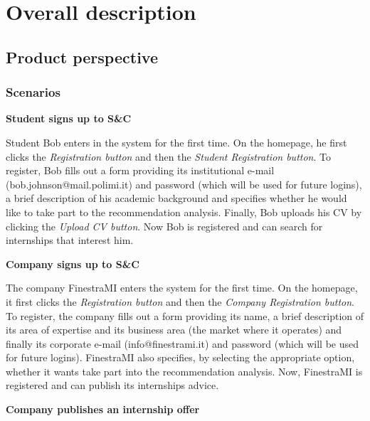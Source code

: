 \chapter{Overall description}
	\section{Product perspective}
		\subsection{Scenarios}
			\textbf{Student signs up to S\&C}
			\begin{flushleft}
				Student Bob enters in the system for the first time. On the homepage, he first clicks the \emph{Registration button} and then the \emph{Student Registration button}. To register, Bob fills out a form providing its institutional e-mail (bob.johnson@mail.polimi.it) and password (which will be used for future logins), a brief description of his academic background and specifies whether he would like to take part to the recommendation analysis. Finally, Bob uploads his CV by clicking the \emph{Upload CV button}. Now Bob is registered and can search for internships that interest him.
			\end{flushleft}
			\textbf{Company signs up to S\&C}
			\begin{flushleft}
				The company FinestraMI enters the system for the first time. On the homepage, it first clicks the \emph{Registration button} and then the \emph{Company Registration button}. To register, the company fills out a form providing its name, a brief description of its area of expertise and its business area (the market where it operates) and finally its corporate e-mail (info@finestrami.it) and password (which will be used for future logins). FinestraMI also specifies, by selecting the appropriate option, whether it wants take part into the recommendation analysis. Now, FinestraMI is registered and can publish its internships advice.
			\end{flushleft}
			\textbf{Company publishes an internship offer}
